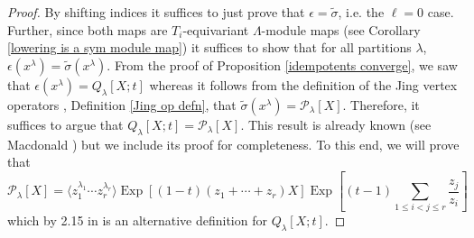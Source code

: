 \documentclass[ALCO,Unicode]{cedram}
\DeclareMathOperator{\EXP}{\mathrm{Exp}}
\begin{document}
\begin{proof}
    By shifting indices it suffices to just prove that $\epsilon = \widetilde{\sigma}$, i.e. the $\ell = 0$ case. Further, since both maps are $T_i$-equivariant $\Lambda$-module maps (see Corollary \ref{lowering is a sym module map}) it suffices to show that for all partitions $\lambda$, $\epsilon(x^{\lambda}) = \widetilde{\sigma}(x^{\lambda}).$ From the proof of Proposition \ref{idempotents converge}, we saw that $\epsilon(x^{\lambda}) = Q_{\lambda}[X;t]$ whereas it follows from the definition of the Jing vertex operators \cite{Jing_91}, Definition \ref{Jing op defn}, that $\widetilde{\sigma}(x^{\lambda}) = \mathcal{P}_{\lambda}[X]$. Therefore, it suffices to argue that $Q_{\lambda}[X;t] = \mathcal{P}_{\lambda}[X].$ This result is already known (see Macdonald \cite[Chapter 3, Section 5, Example $8$, page 238]{Macdonald}) but we include its proof for completeness. To this end, we will prove that 
    \begin{equation}\label{symmetrization-plthysm}
        \mathcal{P}_{\lambda}[X] = \langle z_1^{\lambda_1}\cdots z_r^{\lambda_r} \rangle \EXP[(1-t)(z_1+\cdots+z_r)X]\EXP\left[(t-1)\sum_{1\leq i < j \leq r} \frac{z_j}{z_i}\right]
    \end{equation}
 which by 2.15 in \cite[Chapter 3]{Macdonald} is an alternative definition for $Q_{\lambda}[X;t].$


\end{proof}
\end{document}
